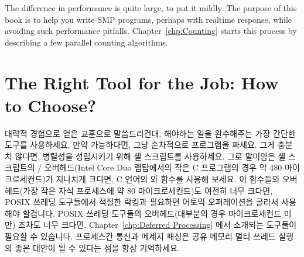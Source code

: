 


The difference in performance is quite large, to put it mildly.
The purpose of this book is to help you write SMP programs,
perhaps with realtime response, while avoiding such performance
pitfalls.
Chapter~\ref{chp:Counting}
starts this process by describing a few parallel counting algorithms.

\section{The Right Tool for the Job: How to Choose?}
\label{sec:toolsoftrade:The Right Tool for the Job: How to Choose?}

대략적 경험으로 얻은 교훈으로 말씀드리건대, 해야하는 일을 완수해주는 가장
간단한 도구를 사용하세요.
만약 가능하다면, 그냥 순차적으로 프로그램을 짜세요.
그게 충분치 않다면, 병렬성을 성립시키기 위해 셸 스크립트를 사용하세요.
그로 말미암은 셸 스크립트의 / 오버헤드(Intel Core Duo
랩탑에서의 작은 C 프로그램의 경우 약 480 마이크로세컨드)가 지나치게 크다면, C
언어의  와  함수를 사용해 보세요.
이 함수들의 오버헤드(가장 작은 자식 프로세스에 약 80 마이크로세컨드)도 여전히
너무 크다면, POSIX 쓰레딩 도구들에서 적절한 락킹과 필요하면 어토믹 오퍼레이션을
골라서 사용해야 할겁니다.
POSIX 쓰레딩 도구들의 오버헤드(대부분의 경우 마이크로세컨드 미만) 조차도 너무
크다면, Chapter~\ref{chp:Deferred Processing} 에서 소개되는 도구들이 필요할 수
있습니다.
프로세스간 통신과 메세지 패싱은 공유 메모리 멀티 쓰레드 실행의 좋은 대안이 될
수 있다는 점을 항상 기억하세요.

